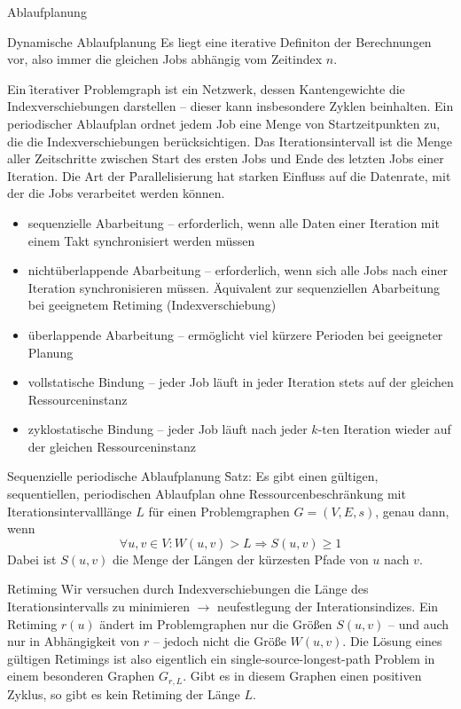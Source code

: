 \begin{chapter}{Ablaufplanung}
  \begin{section}{Dynamische Ablaufplanung}
   Es liegt eine iterative Definiton der Berechnungen vor, also immer die gleichen Jobs abhängig vom Zeitindex $n$.
   
   Ein \f{iterativer Problemgraph} ist ein Netzwerk, dessen Kantengewichte die Indexverschiebungen darstellen -- dieser kann insbesondere Zyklen beinhalten. Ein periodischer Ablaufplan ordnet jedem Job eine Menge von Startzeitpunkten zu, die die Indexverschiebungen berücksichtigen. Das Iterationsintervall ist die Menge aller Zeitschritte zwischen Start des ersten Jobs und Ende des letzten Jobs einer Iteration. Die Art der \f{Parallelisierung} hat starken Einfluss auf die Datenrate, mit der die Jobs verarbeitet werden können.
   \begin{itemize}
    \item sequenzielle Abarbeitung -- erforderlich, wenn alle Daten einer Iteration mit einem Takt synchronisiert werden müssen
    \item nichtüberlappende Abarbeitung -- erforderlich, wenn sich alle Jobs nach einer Iteration synchronisieren müssen. Äquivalent zur sequenziellen Abarbeitung bei geeignetem Retiming (Indexverschiebung)
    \item überlappende Abarbeitung -- ermöglicht viel kürzere Perioden bei geeigneter Planung
   \end{itemize}
   
   \begin{itemize}
    \item vollstatische Bindung -- jeder Job läuft in jeder Iteration stets auf der gleichen Ressourceninstanz
    \item zyklostatische Bindung -- jeder Job läuft nach jeder $k$-ten Iteration wieder auf der gleichen Ressourceninstanz
   \end{itemize}
   
   \begin{subsection}{Sequenzielle periodische Ablaufplanung}
    \f{Satz:} Es gibt einen gültigen, sequentiellen, periodischen Ablaufplan ohne Ressourcenbeschränkung mit Iterationsintervalllänge $L$ für einen Problemgraphen $G=(V,E,s)$, genau dann, wenn
    \[ \forall u,v\in V: W(u,v)>L \Rightarrow S(u,v) \geq 1 \]
    Dabei ist $S(u,v)$ die Menge der Längen der kürzesten Pfade von $u$ nach $v$.
   \end{subsection}
   
   \begin{subsection}{Retiming}
    Wir versuchen durch Indexverschiebungen die Länge des Iterationsintervalls zu minimieren $\rightarrow$ neufestlegung der Interationsindizes. Ein Retiming $r(u)$ ändert im Problemgraphen nur die Größen $S(u,v)$ -- und auch nur in Abhängigkeit von $r$ -- jedoch nicht die Größe $W(u,v)$. Die Lösung eines gültigen Retimings ist also eigentlich ein single-source-longest-path Problem in einem besonderen Graphen $G_{r,L}$. Gibt es in diesem Graphen einen positiven Zyklus, so gibt es kein Retiming der Länge $L$.
    

\end{subsection}
\end{section}
\end{chapter}
